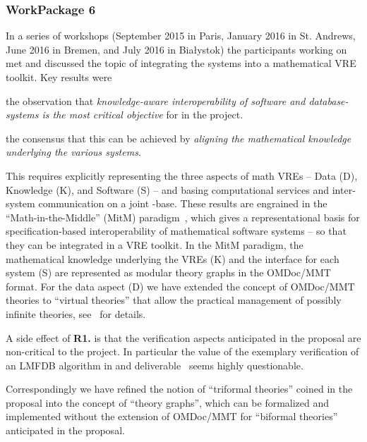 \documentclass{deliverablereport}
\begin{document}
  \subsubsection{WorkPackage 6}
  In a series of workshops (September 2015 in Paris, January 2016 in St. Andrews, June
  2016 in Bremen, and July 2016 in Bia{\l}ystok) the participants working on
   met and discussed the topic of integrating the \pn systems into a
  mathematical VRE toolkit.  Key results were
  \begin{compactitem}[\bf R1.]
  \item the observation that \emph{knowledge-aware interoperability of software and
      database-systems is the most critical objective} for  in the \pn
    project.
  \item the consensus that this can be achieved by \emph{aligning the mathematical
      knowledge underlying the various systems}.
  \end{compactitem}
  This requires explicitly representing the three aspects of math VREs -- Data (D),
  Knowledge (K), and Software (S) -- and basing computational services and inter-system
  communication on a joint \DKS-base. These results are engrained in the
  ``Math-in-the-Middle'' (MitM) paradigm~\cite{DehKohKon:iop16}, which gives a
  representational basis for specification-based interoperability of mathematical software
  systems -- so that they can be integrated in a VRE toolkit. In the MitM paradigm, the
  mathematical knowledge underlying the VREs (K) and the interface for each
  system (S) are represented as modular theory graphs in the OMDoc/MMT format. For the
  data aspect (D) we have extended the concept of OMDoc/MMT theories to ``virtual
  theories'' that allow the practical management of possibly infinite theories,
  see~\cite{ODK-D6.2} for details.

  A side effect of \textbf{R1.} is that the verification aspects anticipated in the
  proposal are non-critical to the \pn project. In particular the value of the exemplary
  verification of an LMFDB algorithm in  and
  deliverable~ seems highly questionable.

  Correspondingly we have refined the notion of ``triformal theories'' coined in the
  proposal into the concept of ``\DKS theory graphs'', which can be formalized and
  implemented without the extension of OMDoc/MMT for ``biformal theories'' anticipated in
  the proposal.
\end{document}
